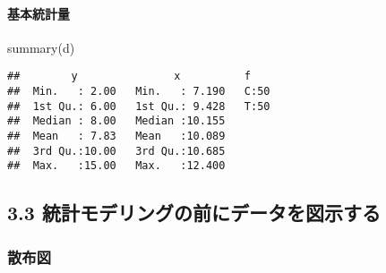 \documentclass[
]{article}
\newenvironment{Shaded}{\begin{snugshade}}{\end{snugshade}}
\newcommand{\AttributeTok}[1]{\textcolor[rgb]{0.77,0.63,0.00}{#1}}
\newcommand{\DecValTok}[1]{\textcolor[rgb]{0.00,0.00,0.81}{#1}}
\newcommand{\FunctionTok}[1]{\textcolor[rgb]{0.00,0.00,0.00}{#1}}
\newcommand{\NormalTok}[1]{#1}
\newcommand{\SpecialCharTok}[1]{\textcolor[rgb]{0.00,0.00,0.00}{#1}}
\newcommand{\StringTok}[1]{\textcolor[rgb]{0.31,0.60,0.02}{#1}}
\begin{document}
\hypertarget{ux57faux672cux7d71ux8a08ux91cf}{%
\paragraph{基本統計量}\label{ux57faux672cux7d71ux8a08ux91cf}}

\begin{Shaded}
\begin{Highlighting}[]
\FunctionTok{summary}\NormalTok{(d)}
\end{Highlighting}
\end{Shaded}

\begin{verbatim}
##        y               x          f     
##  Min.   : 2.00   Min.   : 7.190   C:50  
##  1st Qu.: 6.00   1st Qu.: 9.428   T:50  
##  Median : 8.00   Median :10.155         
##  Mean   : 7.83   Mean   :10.089         
##  3rd Qu.:10.00   3rd Qu.:10.685         
##  Max.   :15.00   Max.   :12.400
\end{verbatim}

\hypertarget{ux7d71ux8a08ux30e2ux30c7ux30eaux30f3ux30b0ux306eux524dux306bux30c7ux30fcux30bfux3092ux56f3ux793aux3059ux308b}{%
\subsection{3.3
統計モデリングの前にデータを図示する}\label{ux7d71ux8a08ux30e2ux30c7ux30eaux30f3ux30b0ux306eux524dux306bux30c7ux30fcux30bfux3092ux56f3ux793aux3059ux308b}}

\hypertarget{ux6563ux5e03ux56f3}{%
\subsubsection{散布図}\label{ux6563ux5e03ux56f3}}

\begin{Shaded}
\end{Shaded}
\end{document}
